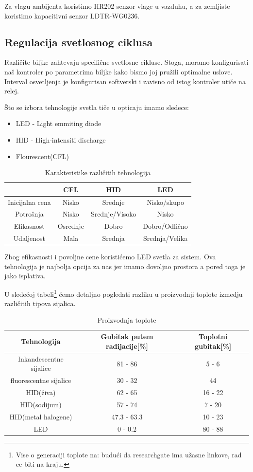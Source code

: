 \documentclass[a4paper,11pt]{book}
\begin{document}
Za vlagu ambijenta koristimo HR202 senzor vlage u vazduhu, a za zemljiste koristimo kapacitivni senzor LDTR-WG0236.

\subsection{Regulacija svetlosnog ciklusa}
Različite biljke zahtevaju specifične svetlosne cikluse. Stoga, moramo konfigurisati naš kontroler po parametrima biljke kako bismo joj pružili optimalne uslove. Interval osvetljenja je konfigurisan softverski i zavisno od istog kontroler utiče na relej. 

Što se izbora tehnologije svetla tiče u opticaju imamo sledece:

\begin{itemize}
  \item LED - Light emmiting diode
  \item HID - High-intensiti discharge
  \item Flourescent(CFL)
\end{itemize}

\begin{table}[ht]
  \caption{Karakteristike različitih tehnologija}
  \centering
  \begin{tabular}{|c|c|c|c|}
  \hline
   & CFL & HID & LED \\ \hline
  Inicijalna cena & Nisko & Srednje & Nisko/skupo \\ \hline
  Potrošnja & Nisko & Srednje/Visoko & Nisko \\ \hline
  Efikasnost & Osrednje & Dobro & Dobro/Odlično \\ \hline
  Udaljenost & Mala & Srednja & Srednja/Velika \\ \hline
  \end{tabular}
\end{table}

Zbog efikasnosti i povoljne cene koristićemo LED svetla za sistem. Ova tehnologija je najbolja opcija za nas jer imamo dovoljno prostora a pored toga je jako isplativa.

U sledećoj tabeli\footnote{Vise o generaciji toplote na: budući da researchgate ima užasne linkove, rad ce biti na kraju.} ćemo detaljno pogledati razliku u proizvodnji toplote izmedju različitih tipova sijalica.


\begin{table}[ht]
  \caption{Proizvodnja toplote}
  \centering
  \begin{tabular}{|c|c|c|}
  \hline
    Tehnologija & Gubitak putem radijacije[\%] & Toplotni gubitak[\%] \\ \hline
  Inkandescentne sijalice & 81 - 86 & 5 - 6 \\ \hline
  fluorescentne sijalice & 30 - 32 & 44 \\ \hline
  HID(živa) & 62 - 65 & 16 - 22 \\ \hline
  HID(sodijum) & 57 - 74 & 7 - 20 \\ \hline
  HID(metal halogene) & 47.3 - 63.3 & 10 - 23 \\ \hline
  LED & 0 - 0.2 & 80 - 88 \\ \hline
  \end{tabular}
\end{table}
\end{document}
